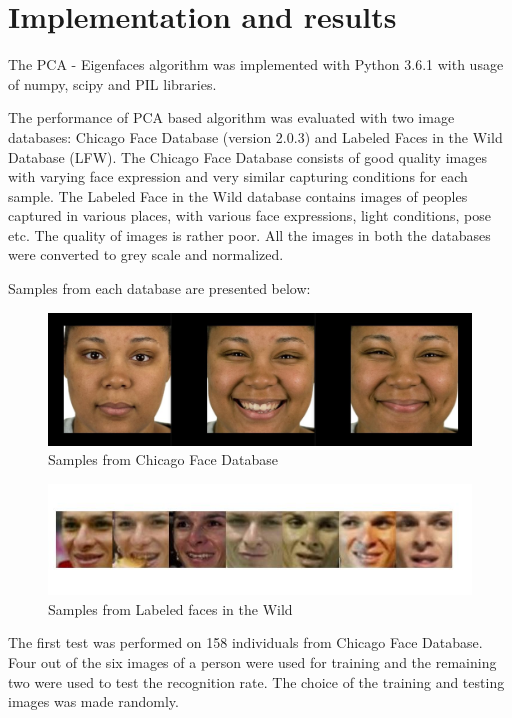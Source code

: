\section{Implementation and results}

The PCA - Eigenfaces algorithm was implemented with Python 3.6.1 with usage of numpy, scipy and PIL libraries. 

The performance of PCA based algorithm was evaluated with two image databases: Chicago Face Database (version 2.0.3) and Labeled Faces in the Wild Database (LFW).  The Chicago Face Database consists of good quality images with varying face expression and very similar capturing conditions for each sample. The Labeled Face in the Wild database contains images of peoples captured in various places, with various face expressions, light conditions, pose etc. The quality of images is rather poor. All the images in both the databases were converted to grey scale and normalized.


Samples from each database are presented below:

\begin{figure}[H]
\centering
\includegraphics[scale=0.3]{CFD_samples.jpg}
\caption{Samples from Chicago Face Database}
\end{figure} 


\begin{figure}[H]
\centering
\includegraphics[scale=0.7]{lfw_samples.jpg}
\caption{Samples from Labeled faces in the Wild}
\end{figure} 

The first test was performed on 158 individuals from Chicago Face Database. Four out of the six images of a person were used for training and the remaining two were used to test the recognition rate. The choice of the training and testing images was made randomly.


